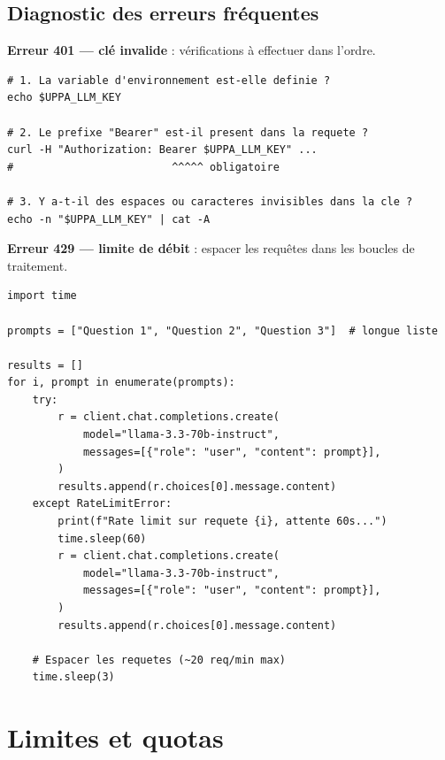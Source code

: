 \documentclass[12pt, a4paper, twoside]{article}
\begin{document}
\subsection{Diagnostic des erreurs fréquentes}

\textbf{Erreur 401 — clé invalide} : vérifications à effectuer dans l'ordre.

\begin{lstlisting}[style=bashstyle, caption={Diagnostic d'une erreur 401}]
# 1. La variable d'environnement est-elle definie ?
echo $UPPA_LLM_KEY

# 2. Le prefixe "Bearer" est-il present dans la requete ?
curl -H "Authorization: Bearer $UPPA_LLM_KEY" ...
#                         ^^^^^ obligatoire

# 3. Y a-t-il des espaces ou caracteres invisibles dans la cle ?
echo -n "$UPPA_LLM_KEY" | cat -A
\end{lstlisting}

\textbf{Erreur 429 — limite de débit} : espacer les requêtes dans les boucles de traitement.

\begin{lstlisting}[style=pythonstyle, caption={Gestion du rate limit dans une boucle de traitement}]
import time

prompts = ["Question 1", "Question 2", "Question 3"]  # longue liste

results = []
for i, prompt in enumerate(prompts):
    try:
        r = client.chat.completions.create(
            model="llama-3.3-70b-instruct",
            messages=[{"role": "user", "content": prompt}],
        )
        results.append(r.choices[0].message.content)
    except RateLimitError:
        print(f"Rate limit sur requete {i}, attente 60s...")
        time.sleep(60)
        r = client.chat.completions.create(
            model="llama-3.3-70b-instruct",
            messages=[{"role": "user", "content": prompt}],
        )
        results.append(r.choices[0].message.content)

    # Espacer les requetes (~20 req/min max)
    time.sleep(3)
\end{lstlisting}

\section{Limites et quotas}
\label{sec:quotas}
\end{document}
